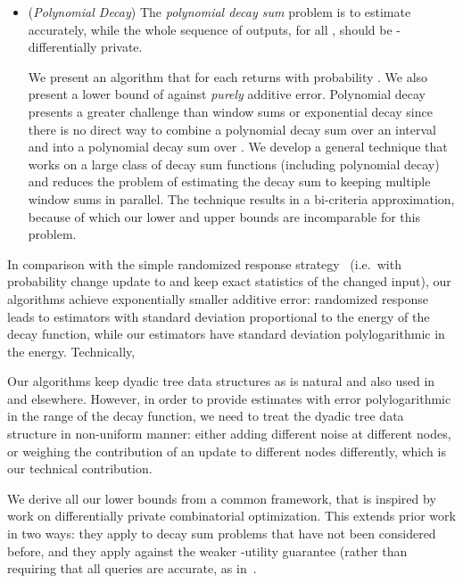 \begin{itemize}
\smallskip
\item ({\em Polynomial Decay}) The \emph{polynomial decay sum} problem
  is to estimate 
  accurately, while the whole sequence  of outputs, for all ,
  should be -differentially private.

\smallskip
  We present an algorithm that for each  returns  with probability . We also present a lower
  bound of  against {\em purely} additive error. Polynomial decay presents a greater challenge than window sums or exponential decay since there is no direct way to combine a polynomial decay sum over an
interval  and 
 into a polynomial decay sum over . We develop a general technique that works on a large class of decay sum functions (including polynomial decay) and reduces the problem of estimating the decay sum to keeping multiple window sums in parallel. The technique results in a bi-criteria approximation, because of which our lower and upper bounds are incomparable for this problem. 
      
\end{itemize}

In comparison with the simple randomized response strategy~\cite{rr} (i.e.~with probability  change update  to  and keep exact statistics of the changed input), our algorithms achieve exponentially smaller additive error: randomized response leads to estimators with standard deviation proportional to the energy of the decay function, while our estimators have standard deviation polylogarithmic in the energy. Technically, 
\begin{packed_item}
\item
Our algorithms keep dyadic tree data structures as is natural and also used in~\cite{dwork-continual,chan2010private} and elsewhere. However, in order to provide estimates with error polylogarithmic in the range of the decay function, we need to treat the dyadic tree data structure in non-uniform manner: either adding different noise at different nodes, or weighing the contribution of an update to different nodes differently, which is our technical contribution.
\item
We derive all our lower bounds from a common framework, that is inspired by work on differentially private combinatorial optimization. This extends prior work in two ways:  they apply to decay sum
problems that have not been considered before, and they apply against the
weaker -utility  guarantee  (rather than requiring
that all queries are accurate, as in~\cite{dwork-continual}. 
\end{packed_item}






